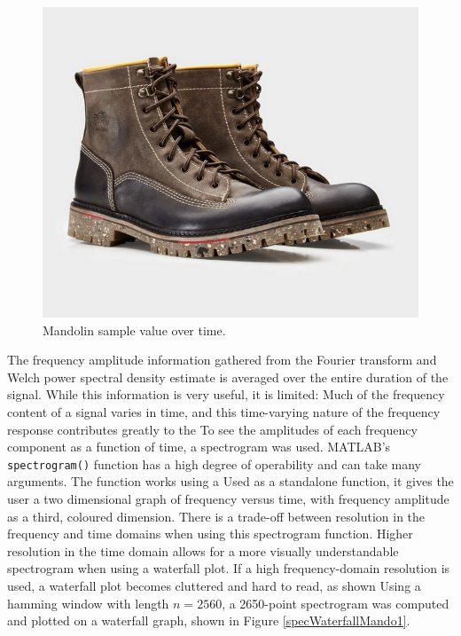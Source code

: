 \documentclass{article}
\begin{document}
        \begin{figure}[h]
            \includegraphics[scale=0.25]{images/placeholder.png}%
            \centering
            \caption{Mandolin sample value over time.}
            \label{welchMando}
        \end{figure}
        The frequency amplitude information gathered from the Fourier transform and Welch power spectral density estimate is averaged over the entire duration of the signal.
        While this information is very useful, it is limited: Much of the frequency content of a signal varies in time, and this time-varying nature of the frequency response contributes greatly to the 
        To see the amplitudes of each frequency component as a function of time, a spectrogram was used.
        MATLAB's \texttt{spectrogram()} function has a high degree of operability and can take many arguments.
        The function works using a 
        Used as a standalone function, it gives the user a two dimensional graph of frequency versus time, with frequency amplitude as a third, coloured dimension.
        There is a trade-off between resolution in the frequency and time domains when using this spectrogram function.
        Higher resolution in the time domain allows for a more visually understandable spectrogram when using a waterfall plot.
        If a high frequency-domain resolution is used, a waterfall plot becomes cluttered and hard to read, as shown 
        Using a hamming window with length $n = 2560$, a 2650-point spectrogram was computed and plotted on a waterfall graph, shown in Figure \ref{specWaterfallMando1}.
\end{document}
